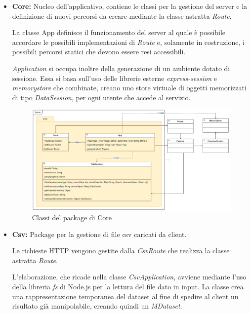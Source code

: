 \documentclass[../manuale_sviluppatore.tex]{subfiles}
\begin{document}
\begin{itemize}
	
	\item \textbf{Core:} Nucleo dell'applicativo, contiene le classi per la gestione del server
	e la definizione di nuovi percorsi da creare mediante la classe astratta \emph{Route}. 
	
	La classe App definisce il funzionamento del server al quale è possibile accordare le 
	possibili implementazioni di \emph{Route} e, solamente in costruzione, i possibili 
	percorsi statici che devono essere resi accessibili. 
	
	\emph{Application} si occupa inoltre della generazione di un ambiente dotato di sessione. Essa 
	si basa sull'uso delle librerie esterne \emph{express-session} e \emph{memorystore}
	che combinate, creano uno store virtuale di oggetti memorizzati di tipo \emph{DataSession}, per ogni 
	utente che accede al servizio.
		
	\begin{figure}[H]
		\centering
		\includegraphics[width=18cm]{src/img/server-core.png}
		\caption{Classi del package di Core}
	\end{figure}

	\newpage
	\item \textbf{Csv:} Package per la gestione di file csv caricati da client. 
	
	Le richieste HTTP vengono gestite dalla \emph{CsvRoute} che realizza la classe astratta \emph{Route}.
	
	L'elaborazione, che ricade nella classe \emph{CsvApplication}, avviene mediante l'uso della libreria \emph{fs} di Node.js per la 
	lettura del file dato in input. La classe crea una rappresentazione temporanea del dataset al fine di spedire al client un risultato 
	già manipolabile, creando quindi un \emph{MDataset}.
	

\end{itemize}
\end{document}
